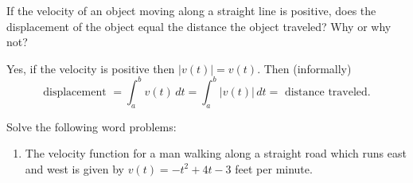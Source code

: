 \documentclass[nooutcomes]{ximera}
\renewcommand{\d}{\,d}
\newcommand{\eval}[1]{\bigg[ #1 \bigg]}
\renewenvironment{freeResponse}{
\ifhandout\setbox0\vbox\bgroup\else
\begin{trivlist}\item[\hskip \labelsep\bfseries Solution:\hspace{2ex}]
\fi}
{\ifhandout\egroup\else
\end{trivlist}
\fi}
\begin{document}
\begin{problem}
  If the velocity of an object moving along a straight line is
  positive, does the displacement of the object equal the distance the
  object traveled?  Why or why not?
  \begin{freeResponse}
    Yes, if the velocity is positive then $\left| v(t) \right|=v(t)$.
    Then (informally)
    \begin{equation*}
      \text{displacement } = \int_a^b v(t) \d t = \int_a^b \left| v(t) \right| \d t = \text{ distance traveled}.
    \end{equation*}
  \end{freeResponse}
\end{problem}





\begin{problem}
Solve the following word problems:

	\begin{enumerate}
	
	\item  The velocity function for a man walking along a straight road which runs east and west is given by 
	$v(t) = -t^2 + 4t - 3$ feet per minute.
		
\end{enumerate}
\end{problem}
\end{document}
